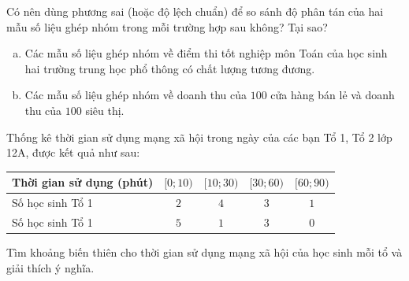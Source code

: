 \begin{bt}%

	Có nên dùng phương sai (hoặc độ lệch chuẩn) để so sánh độ phân tán của hai mẫu số liệu ghép nhóm trong mỗi trường hợp sau không? Tại sao?
	\begin{enumerate}[a)]
	\item  Các mẫu số liệu ghép nhóm về điểm thi tốt nghiệp môn Toán của học sinh hai trường trung học phổ thông có chất lượng tương đương.
	\item Các mẫu số liệu ghép nhóm về doanh thu của $100$ cửa hàng bán lẻ và doanh thu của $100$ siêu thị.
	\end{enumerate}
\end{bt}

\begin{bt}%

	Thống kê thời gian sử dụng mạng xã hội trong ngày của các bạn Tổ 1, Tổ 2 lớp 12A, được kết quả như sau:
	\begin{center}
		\begin{tabular}{|l|c|c|c|c|}
			\hline
			Thời gian sử dụng (phút) & $[0;10 )$ & $[ 10;30)$ &$[30;60 )$ & $[60;90)$ \\
			\hline
			Số học sinh Tổ 1 & $2$ & $4$ & $3$ & $1$ \\
			\hline
			Số học sinh Tổ 1 & $5$ & $1$ & $3$ & $0$ \\
			\hline
		\end{tabular}
	\end{center}
	Tìm khoảng biến thiên cho thời gian sử dụng mạng xã hội của học sinh mỗi tổ và giải thích ý nghĩa.
\end{bt}

